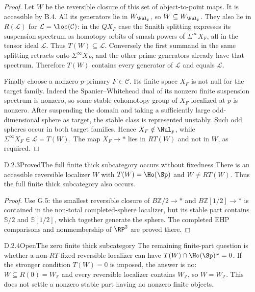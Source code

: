 \begin{proof}
Let $W$ be the reversible closure of this set of object-to-point maps. It is accessible by B.4. All its generators lie in $W_{\Nul_p}$, so $W\subseteq W_{\Nul_p}$. They also lie in $R(\mathcal L)$ for $\mathcal L=\loc(\mathcal C)$: in the $QX_F$ case the Snaith splitting expresses its suspension spectrum as homotopy orbits of smash powers of $\Sigma^\infty X_F$, all in the tensor ideal $\mathcal L$. Thus $T(W)\subseteq\mathcal L$. Conversely the first summand in the same splitting retracts onto $\Sigma^\infty X_F$, and the other-prime generators already have that spectrum. Therefore $T(W)$ contains every generator of $\mathcal L$ and equals $\mathcal L$.

Finally choose a nonzero $p$-primary $F\in\mathcal C$. Its finite space $X_F$ is not null for the target family. Indeed the Spanier--Whitehead dual of its nonzero finite suspension spectrum is nonzero, so some stable cohomotopy group of $X_F$ localized at $p$ is nonzero. After suspending the domain and taking a sufficiently large odd-dimensional sphere as target, the stable class is represented unstably. Such odd spheres occur in both target families. Hence $X_F\notin\Nul_p$, while $\Sigma^\infty X_F\in\mathcal L=T(W)$. The map $X_F\to *$ lies in $RT(W)$ and not in $W$, as required.
\end{proof}

\begin{claim}{D.2.3}{Proved}{The full finite thick subcategory occurs without fixedness}
There is an accessible reversible localizer $W$ with $T(W)=\Ho(\Sp)$ and $W\neq RT(W)$. Thus the full finite thick subcategory also occurs.
\end{claim}
\begin{proof}
Use G.5: the smallest reversible closure of $B\mathbb Z/2\to *$ and $B\mathbb Z[1/2]\to *$ is contained in the non-total completed-sphere localizer, but its stable part contains $\mathbb S/2$ and $\mathbb S[1/2]$, which together generate the sphere. The completed EHP comparisons and nonmembership of $\RP^2$ are proved there.
\end{proof}

\begin{claim}{D.2.4}{Open}{The zero finite thick subcategory}
The remaining finite-part question is whether a non-$RT$-fixed reversible localizer can have $T(W)\cap\Ho(\Sp)^\omega=0$. If the stronger condition $T(W)=0$ is imposed, the answer is no: $W\subseteq R(0)=W_{\mathbb Z}$ and every reversible localizer contains $W_{\mathbb Z}$, so $W=W_{\mathbb Z}$. This does not settle a nonzero stable part having no nonzero finite objects.
\end{claim}


